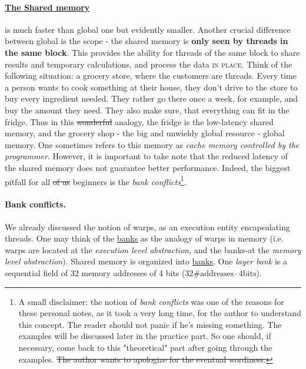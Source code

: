 \paragraph{\underline{The Shared memory}} \label{grocery_store} is much faster than global one but evidently smaller. Another 
crucial difference between global is the scope - the shared memory is \textbf{only seen by threads in the same block}. This provides 
the ability for threads of the same block to share results and temporary calculations, and process the data \textsc{in place}. 
Think of the following situation: a grocery store, where the customers are threads. Every time a person 
wants to cook something at their house, they don't drive to the store to buy every ingredient needed. They rather go there 
once a week, for example, and buy the amount they need. They also make sure, 
that everything can fit in the fridge. Thus 
in this \sout{wonderful} analogy, the fridge is the low-latency shared memory, and the grocery shop - the 
big and unwieldy global resource - global memory.
One sometimes refers to this memory as 
\textsl{cache memory controlled by the programmer}. However, it is important to take note that the reduced 
latency of the shared memory does not guarantee better performance. Indeed, the biggest pitfall for all \sout{of us} beginners 
is the \textit{bank conflicts}\footnote{A small disclaimer: the notion of \textit{bank conflicts} was one of the reasons for these personal 
notes, as it took a very long time, for the author to understand this concept. The reader should not panic if he's missing something. The examples will be discussed later in the practice part. So one 
should, if necessary, come back to this "theoretical" part after going through the examples. \sout{The author wants to apologize 
for the eventual wordiness.}}. 

\paragraph{Bank conflicts.}We already discussed the notion of warps, as an execution entity encapsulating threads. 
One may think of the \underline{banks} as the analogy of warps in memory
 (i.e. warps are located at the \textit{execution level abstraction}, and the 
 banks-at the \textit{memory level abstraction}). 
 Shared memory is organized into \underline{banks}.
One \textit{layer bank} is a sequential field of 32 memory addresses of 4 bits ($32\text{\#addresses}\cdot 4\text{bits}$). 

